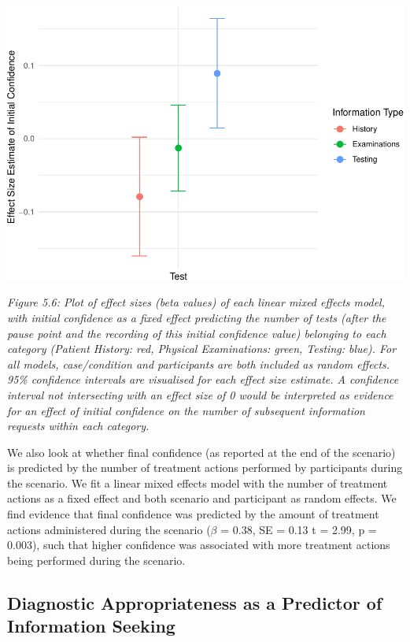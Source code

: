 \documentclass[a4paper, nobind]{templates/ociamthesis}
\begin{document}
\begin{center}\includegraphics[width=1\linewidth]{_main_files/figure-latex/finalconfidenceplot-1} \end{center}

\emph{Figure 5.6: Plot of effect sizes (beta values) of each linear mixed effects model, with initial confidence as a fixed effect predicting the number of tests (after the pause point and the recording of this initial confidence value) belonging to each category (Patient History: red, Physical Examinations: green, Testing: blue). For all models, case/condition and participants are both included as random effects. 95\% confidence intervals are visualised for each effect size estimate. A confidence interval not intersecting with an effect size of 0 would be interpreted as evidence for an effect of initial confidence on the number of subsequent information requests within each category.}

We also look at whether final confidence (as reported at the end of the scenario) is predicted by the number of treatment actions performed by participants during the scenario. We fit a linear mixed effects model with the number of treatment actions as a fixed effect and both scenario and participant as random effects. We find evidence that final confidence was predicted by the amount of treatment actions administered during the scenario (\(\beta\) = 0.38, SE = 0.13 t = 2.99, p = 0.003), such that higher confidence was associated with more treatment actions being performed during the scenario.

\subsection*{Diagnostic Appropriateness as a Predictor of Information Seeking}\label{diagnostic-appropriateness-as-a-predictor-of-information-seeking}
\end{document}
